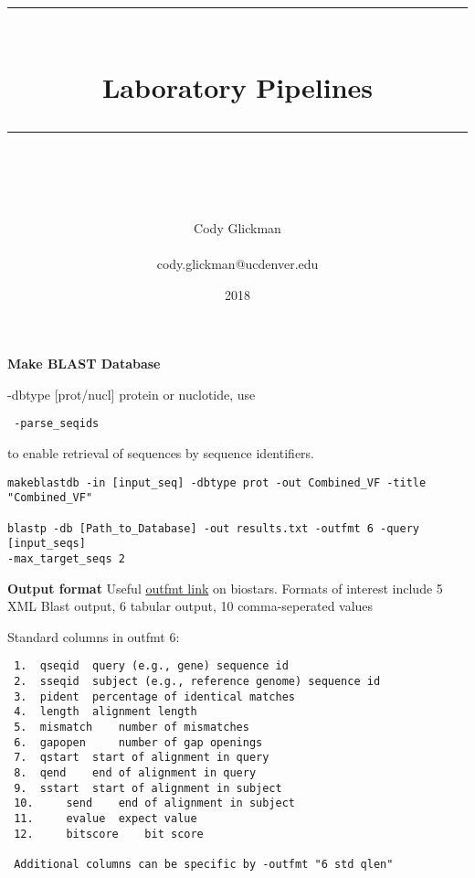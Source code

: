 \documentclass[idxtotoc,hyperref,openany,oneside]{labbook} %
\newcommand{\HRule}{\rule{\linewidth}{0.5mm}} %
\begin{document}

\frontmatter %
\title{
\begin{center}
\HRule \\[0.4cm]
{\Huge \bfseries Laboratory Pipelines \\[0.5cm] \Large} %
\HRule \\[1.5cm]
\end{center}
}
\author{\Huge Cody Glickman \\ \\ \LARGE cody.glickman@ucdenver.edu \\[2cm]} %
\date{2018} %
\maketitle

\tableofcontents

\mainmatter %



\textbf{Make BLAST Database}

-dbtype [prot/nucl] protein or nuclotide, 
use \begin{verbatim} -parse_seqids \end{verbatim} to enable retrieval 
of sequences by sequence identifiers. 


\begin{verbatim}
makeblastdb -in [input_seq] -dbtype prot -out Combined_VF -title "Combined_VF"

blastp -db [Path_to_Database] -out results.txt -outfmt 6 -query [input_seqs]
-max_target_seqs 2
\end{verbatim}

\textbf{Output format}
Useful \href{https://www.biostars.org/p/88944/}{outfmt link} on biostars. Formats of interest include 5 XML Blast output, 6 tabular output, 10 comma-seperated values

Standard columns in outfmt 6:
\begin{verbatim}
 1.	 qseqid	 query (e.g., gene) sequence id
 2.	 sseqid	 subject (e.g., reference genome) sequence id
 3.	 pident	 percentage of identical matches
 4.	 length	 alignment length
 5.	 mismatch	 number of mismatches
 6.	 gapopen	 number of gap openings
 7.	 qstart	 start of alignment in query
 8.	 qend	 end of alignment in query
 9.	 sstart	 start of alignment in subject
 10.	 send	 end of alignment in subject
 11.	 evalue	 expect value
 12.	 bitscore	 bit score
 
 Additional columns can be specific by -outfmt "6 std qlen"
\end{verbatim}
\end{document}
